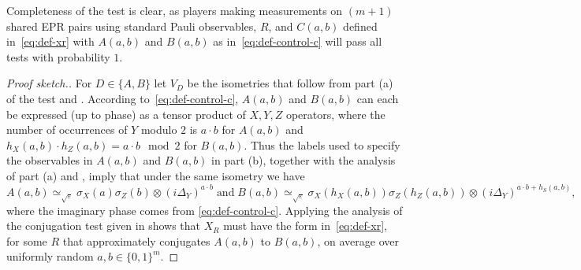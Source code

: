 \documentclass{toc}
\newcommand{\eps}{\varepsilon}
\begin{document}
 Completeness of the test is clear, as players making measurements on $(m+1)$ shared EPR pairs using standard Pauli observables, $R$, and $C(a,b)$ defined in~\eqref{eq:def-xr} with $A(a,b)$ and $B(a,b)$ as in~\eqref{eq:def-control-c} will pass all tests with probability $1$.  

\begin{proof}[Proof sketch.]
For $D\in\{A,B\}$ let $V_D$ be the isometries that follow from part (a) of the test and .
According to~\eqref{eq:def-control-c}, $A(a,b)$ and $B(a,b)$ can each be expressed (up to phase) as a tensor product of $X,Y,Z$ operators, where the number of occurrences of $Y$ modulo $2$ is $a\cdot b$ for $A(a,b)$ and  $h_X(a,b)\cdot h_Z(a,b) = a\cdot b\mod 2$ for $B(a,b)$. Thus the labels used to specify the observables in $A(a,b)$ and $B(a,b)$ in part (b), together with the analysis of part (a) and , imply that under the same isometry we  have
$$A(a,b) \simeq_{\sqrt{\eps}} \sigma_X(a)\sigma_Z(b) \otimes (i\Delta_Y)^{a\cdot b}
\;\text{and}\;
 B(a,b) \simeq_{\sqrt{\eps}} \sigma_X(h_X(a,b)) \sigma_Z(h_Z(a,b)) \otimes (i\Delta_Y)^{a\cdot b + h_S(a,b)},$$
where the imaginary phase comes from \eqref{eq:def-control-c}. 
Applying the analysis of the conjugation test given in  shows that $X_R$ must have the form in~\eqref{eq:def-xr}, for some $R$ that approximately conjugates $A(a,b)$ to $B(a,b)$, on average over uniformly random $a,b\in\{0,1\}^m$.


\end{proof}
\end{document}
